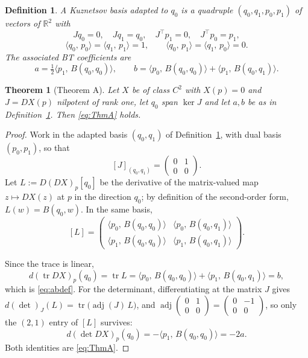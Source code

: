\documentclass[10pt,a4paper]{amsart}
\newtheorem{definition}{Definition}
\newtheorem{theorem}{Theorem}
\newcommand{\R}{\mathbb{R}}
\DeclareMathOperator{\dt}{det}
\newcommand{\ip}[2]{\langle #1,\, #2\rangle}
\newcommand{\tr}{\operatorname{tr}}
\begin{document}
	\begin{definition}\label{def:kbasis}
		A \emph{Kuznetsov basis adapted to $q_{0}$} is a quadruple
		$(q_{0},q_{1},p_{0},p_{1})$ of vectors of $\R^{2}$ with
		\begin{equation}\label{eq:kbasis}
			Jq_{0}=0,\quad Jq_{1}=q_{0},\quad
			J^{\top}p_{1}=0,\quad J^{\top}p_{0}=p_{1},
		\end{equation}
		\begin{equation}\label{eq:biorth}
			\ip{q_{0}}{p_{0}}=\ip{q_{1}}{p_{1}}=1,\qquad
			\ip{q_{0}}{p_{1}}=\ip{q_{1}}{p_{0}}=0 .
		\end{equation}
		The associated BT coefficients are
		\begin{equation}\label{eq:abdef}
			a=\tfrac12\ip{p_{1}}{B(q_{0},q_{0})},\qquad
			b=\ip{p_{0}}{B(q_{0},q_{0})}+\ip{p_{1}}{B(q_{0},q_{1})} .
		\end{equation}
	\end{definition}

	\begin{theorem}[Theorem A]\label{thm:A}
		Let $X$ be of class $C^{2}$ with $X(p)=0$ and $J=DX(p)$ nilpotent of
		rank one, let $q_{0}$ span $\ker J$ and let $a,b$ be as in
		Definition~\ref{def:kbasis}.  Then \eqref{eq:ThmA} holds.
	\end{theorem}

	\begin{proof}
		Work in the adapted basis $(q_{0},q_{1})$ of
		Definition~\ref{def:kbasis}, with dual basis $(p_{0},p_{1})$, so that
		\[
		[J]_{(q_{0},q_{1})}=\begin{pmatrix}0&1\\ 0&0\end{pmatrix}.
		\]
		Let $L:=D(DX)_{p}[q_{0}]$ be the derivative of the matrix-valued map
		$z\mapsto DX(z)$ at $p$ in the direction $q_{0}$; by definition of the
		second-order form, $L(w)=B(q_{0},w)$.  In the same basis,
		\[
		[L]=\begin{pmatrix}
			\ip{p_{0}}{B(q_{0},q_{0})} & \ip{p_{0}}{B(q_{0},q_{1})}\\[2pt]
			\ip{p_{1}}{B(q_{0},q_{0})} & \ip{p_{1}}{B(q_{0},q_{1})}
		\end{pmatrix}.
		\]
		
		Since the trace is linear,
		\[
		d(\tr DX)_{p}(q_{0})=\tr L
		=\ip{p_{0}}{B(q_{0},q_{0})}+\ip{p_{1}}{B(q_{0},q_{1})}=b,
		\]
		which is \eqref{eq:abdef}.  For the determinant, differentiating at the
		matrix $J$ gives $d(\dt)_{J}(L)=\tr\bigl(\operatorname{adj}(J)\,L\bigr)$,
		and
		$\operatorname{adj}\left(\begin{smallmatrix}0&1\\0&0\end{smallmatrix}\right)
		=\left(\begin{smallmatrix}0&-1\\0&0\end{smallmatrix}\right)$, so only
		the $(2,1)$ entry of $[L]$ survives:
		\[
		d(\dt DX)_{p}(q_{0})=-\ip{p_{1}}{B(q_{0},q_{0})}=-2a .
		\]
		Both identities are \eqref{eq:ThmA}.
	\end{proof}
\end{document}
